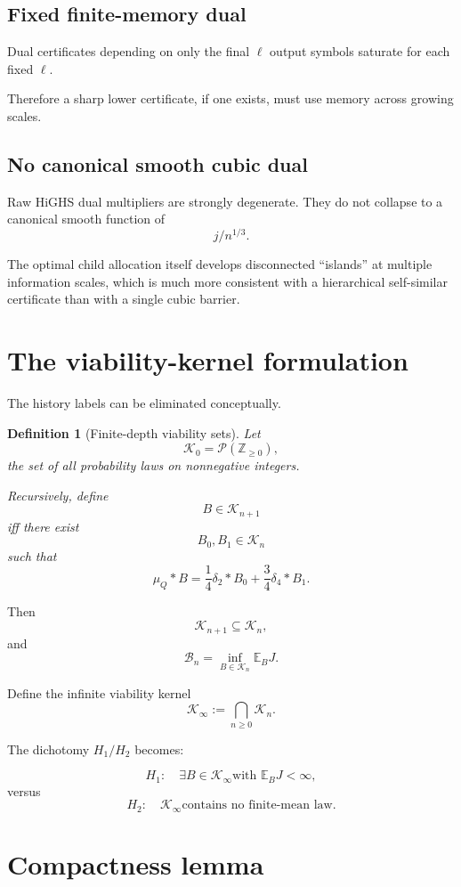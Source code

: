 \documentclass[11pt,a4paper]{article}
\newtheorem{definition}[theorem]{Definition}
\newcommand{\E}{\mathbb E}
\newcommand{\cB}{\mathcal B}
\newcommand{\cK}{\mathcal K}
\newcommand{\Z}{\mathbb Z}
\begin{document}
\subsection{Fixed finite-memory dual}

Dual certificates depending on only the final \(\ell\) output symbols
saturate for each fixed \(\ell\).

Therefore a sharp lower certificate, if one exists, must use memory across
growing scales.

\subsection{No canonical smooth cubic dual}

Raw HiGHS dual multipliers are strongly degenerate.  They do not collapse
to a canonical smooth function of
\[
j/n^{1/3}.
\]

The optimal child allocation itself develops disconnected ``islands'' at
multiple information scales, which is much more consistent with a
hierarchical self-similar certificate than with a single cubic barrier.

\section{The viability-kernel formulation}

The history labels can be eliminated conceptually.

\begin{definition}[Finite-depth viability sets]
Let
\[
\cK_0
=
\mathcal P(\Z_{\ge0}),
\]
the set of all probability laws on nonnegative integers.

Recursively, define
\[
B\in\cK_{n+1}
\]
iff there exist
\[
B_0,B_1\in\cK_n
\]
such that
\[
\boxed{
\mu_Q*B
=
\frac14\delta_2*B_0
+
\frac34\delta_4*B_1.
}
\]
\end{definition}

Then
\[
\cK_{n+1}\subseteq\cK_n,
\]
and
\[
\boxed{
\cB_n
=
\inf_{B\in\cK_n}\E_B J.
}
\]

Define the infinite viability kernel
\[
\boxed{
\cK_\infty
:=
\bigcap_{n\ge0}\cK_n.
}
\]

The dichotomy \(H_1/H_2\) becomes:

\[
\boxed{
H_1:
\quad
\exists B\in\cK_\infty
\text{with }\E_BJ<\infty,
}
\]
versus
\[
\boxed{
H_2:
\quad
\cK_\infty
\text{contains no finite-mean law.}
}
\]

\section{Compactness lemma}
\end{document}
